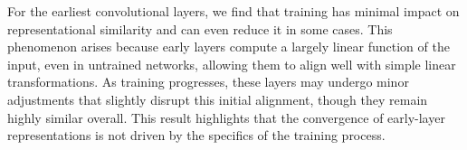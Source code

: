 For the earliest convolutional layers, we find that training has minimal impact on representational similarity and can even reduce it in some cases. This phenomenon arises because early layers compute a largely linear function of the input, even in untrained networks, allowing them to align well with simple linear transformations. As training progresses, these layers may undergo minor adjustments that slightly disrupt this initial alignment, though they remain highly similar overall. This result highlights that the convergence of early-layer representations is not driven by the specifics of the training process.

